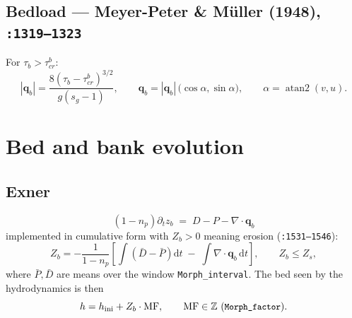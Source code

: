 \documentclass[11pt,a4paper]{article}
\newcommand{\dt}{\partial_t}
\newcommand{\code}[1]{\texttt{\small #1}}
\begin{document}
\subsection{Bedload --- Meyer-Peter \& M\"uller (1948), \code{:1319--1323}}
For $\tau_b>\tau_{cr}^{b}$:
\begin{equation}
  |\bm q_b|=\frac{8\left(\tau_b-\tau_{cr}^{b}\right)^{3/2}}{g\left(s_g-1\right)},
  \qquad
  \bm q_b=|\bm q_b|\,\big(\cos\alpha,\sin\alpha\big),
  \qquad \alpha=\operatorname{atan2}(v,u).
  \label{eq:bedload}
\end{equation}

\section{Bed and bank evolution}

\subsection{Exner}
\begin{equation}
  \boxed{\;\left(1-n_p\right)\dt z_b \;=\; D - P - \nabla\!\cdot\!\bm q_b\;}
  \label{eq:exner}
\end{equation}
implemented in cumulative form with $Z_b>0$ meaning erosion (\code{:1531--1546}):
\begin{equation}
  Z_b=-\frac{1}{1-n_p}\left[\int\!\left(\bar D-\bar P\right)\mathrm dt
       \;-\;\int\!\nabla\!\cdot\!\bm q_b\,\mathrm dt\right],
  \qquad Z_b\le Z_s,
\end{equation}
where $\bar P,\bar D$ are means over the window \code{Morph\_interval}. The bed seen by the
hydrodynamics is then
\begin{equation}
  h = h_{\rm ini} + Z_b\cdot \mathrm{MF},
  \qquad \mathrm{MF}\in\mathbb Z \ \text{(\code{Morph\_factor})}.
  \label{eq:mf}
\end{equation}
\end{document}
